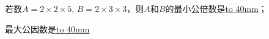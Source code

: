 若数$A = 2 \times 2 \times 5$, $B = 2 \times 3 \times 3$，则$A$和$B$的最小公倍数是\underline{\hbox to 40mm{}}；

最大公因数是\underline{\hbox to 40mm{}}